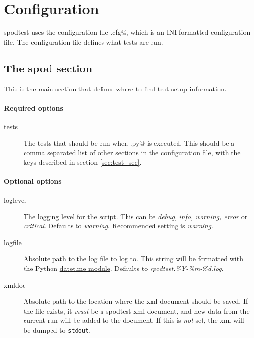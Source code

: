 \section{Configuration}
\gls{spodtest} uses the configuration file \verb@spodconf.cfg@, which is an INI
formatted configuration file. The configuration file defines what tests are
run.

\subsection{The spod section}
This is the main section that defines where to find test setup information. 

\paragraph*{Required options}

\begin{description}
    \item[tests] The tests that should be run when \verb@spodtest.py@ is
        executed. This should be a comma separated list of other sections in
        the configuration file, with the keys described in section
        \ref{sec:test_sec}.
\end{description}

\paragraph*{Optional options}

\begin{description}
    \item[loglevel] The logging level for the script. This can be
        \textit{debug, info, warning, error} or \textit{critical}. Defaults to
        \textit{warning}. Recommended setting is \textit{warning}.
    \item[logfile] Absolute path to the log file to log to. This string will be
        formatted with the Python
        \href{http://docs.python.org/library/datetime.html#strftime-and-strptime-behavior}{datetime module}. 
        Defaults to \textit{spodtest.\%Y-\%m-\%d.log}.
    \item[xmldoc] Absolute path to the location where the \gls{xml} document
        should be saved. If the file exists, it \textit{must} be a
        \gls{spodtest} \gls{xml} document, and new data from the current run
        will be added to the document. If this is \textit{not} set, the
        \gls{xml} will be dumped to \texttt{stdout}.
\end{description}


